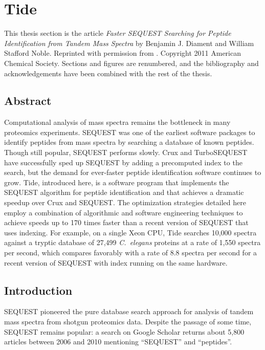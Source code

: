 \chapter{Tide}
\label{chapter:tide}

This thesis section is the article {\it Faster SEQUEST Searching for Peptide
Identification from Tandem Mass Spectra} by Benjamin J. Diament and William
Stafford Noble. Reprinted with permission from \cite{diament:faster}. Copyright
2011 American Chemical Society. Sections and figures are renumbered, and the
bibliography and acknowledgements have been combined with the rest of the
thesis.

\section{Abstract}

Computational analysis of mass spectra remains the bottleneck in many
proteomics experiments. SEQUEST was one of the earliest software
packages to identify peptides from mass spectra by searching a
database of known peptides. Though still popular, SEQUEST performs
slowly. Crux and TurboSEQUEST have successfully sped up SEQUEST by
adding a precomputed index to the search, but the demand for
ever-faster peptide identification software continues to grow. Tide,
introduced here, is a software program that implements the SEQUEST
algorithm for peptide identification and that achieves a dramatic
speedup over Crux and SEQUEST.  The optimization strategies detailed
here employ a combination of algorithmic and software engineering
techniques to achieve speeds up to 170 times faster than a recent
version of SEQUEST that uses indexing.  For example, on a single Xeon
CPU, Tide searches 10,000 spectra against a tryptic database of 27,499
{\it C.\ elegans} proteins at a rate of 1,550 spectra per second,
which compares favorably with a rate of 8.8 spectra per second for a
recent version of SEQUEST with index running on the same hardware.

\section{Introduction}
\label{section:tideintro}

SEQUEST \cite{eng:approach} pioneered the pure database search
approach for analysis of tandem mass spectra from shotgun proteomics
data. Despite the passage of some time, SEQUEST remains popular: a
search on Google Scholar returns about 5,800 articles between 2006
and 2010 mentioning ``SEQUEST'' and ``peptides''.

